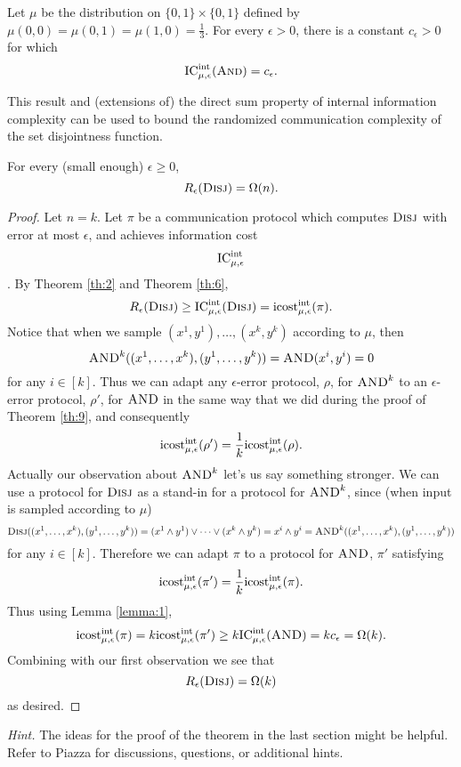 \begin{lemma}\label{lemma:1}
Let $\mu$ be the distribution on $\{0,1\} \times \{0,1\}$ defined by $\mu(0,0) = \mu(0,1) = \mu(1,0) = \frac13$.
For every $\epsilon > 0$, there is a constant $c_\epsilon > 0$ for which
\[
\mathrm{IC}^{\mathrm{int}}_{\mu,\epsilon}(\textsc{And}) = c_\epsilon.
\]
\end{lemma}

This result and (extensions of) the direct sum property of internal information complexity can be used to bound the randomized communication complexity of the set disjointness function.

\begin{theorem}
For every (small enough) $\epsilon \ge 0$, 
\[
R_\epsilon(\textsc{Disj}) = \Omega(n).
\]
\end{theorem}

\begin{proof}
Let $n=k$. Let $\pi$ be a communication protocol which computes $\textsc{Disj}$ with error at most $\epsilon$, and achieves information cost
$$\mathrm{IC}^{\mathrm{int}}_{\mu,\epsilon}$$ . By Theorem \ref{th:2} and Theorem \ref{th:6},
$$R_\epsilon(\textsc{Disj}) \geq \mathrm{IC}^{\mathrm{int}}_{\mu,\epsilon}(\textsc{Disj}) = \mathrm{icost}^{\mathrm{int}}_{\mu,\epsilon}(\pi).$$
Notice that when we sample $(x^1,y^1), \dots, (x^k,y^k)$ according to $\mu$, then
$$\textsc{AND}^k((x^1,\dots,x^k),(y^1,\dots,y^k)) = \textsc{AND}(x^i,y^i) = 0$$
for any $i \in [k]$. Thus we can adapt any $\epsilon$-error protocol, $\rho$, for $\textsc{AND}^k$ to an $\epsilon$-error protocol, $\rho'$, for $\textsc{AND}$ in the same way that we did during the proof of Theorem \ref{th:9}, and consequently
$$\mathrm{icost}^{\mathrm{int}}_{\mu,\epsilon}(\rho') = \frac{1}{k}\mathrm{icost}^{\mathrm{int}}_{\mu,\epsilon}(\rho).$$
Actually our observation about $\textsc{AND}^k$ let's us say something stronger. We can use a protocol for $\textsc{Disj}$ as a stand-in for a protocol for $\textsc{AND}^k$, since (when input is sampled according to $\mu$)
$$\textsc{Disj}((x^1,\dots, x^k),(y^1,\dots,y^k)) = (x^1\wedge y^1) \lor\dots\lor(x^k\wedge y^k) = x^i\wedge y^i = \textsc{AND}^k((x^1,\dots, x^k),(y^1,\dots,y^k))$$
for any $i\in[k]$. Therefore we can adapt $\pi$ to a protocol for $\textsc{AND}$, $\pi'$ satisfying
$$\mathrm{icost}^{\mathrm{int}}_{\mu,\epsilon}(\pi') = \frac{1}{k}\mathrm{icost}^{\mathrm{int}}_{\mu,\epsilon}(\pi).$$
Thus using Lemma \ref{lemma:1},
$$\mathrm{icost}^{\mathrm{int}}_{\mu,\epsilon}(\pi) = k\mathrm{icost}^{\mathrm{int}}_{\mu,\epsilon}(\pi')\geq k\mathrm{IC}^{\mathrm{int}}_{\mu,\epsilon}(\textsc{AND}) = kc_\epsilon = \Omega(k).$$
Combining with our first observation we see that
$$R_\epsilon(\textsc{Disj}) = \Omega(k)$$
as desired.
\end{proof}

\bigskip
\noindent \emph{Hint.} The ideas for the proof of the theorem in the last section might be helpful. Refer to Piazza for discussions, questions, or additional hints.
